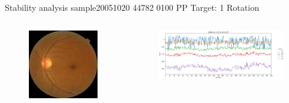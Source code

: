 \documentclass{beamer}
\begin{document}
\begin{frame}{Stability analysis sample}{20051020 44782 0100 PP Target: 1 Rotation}
\begin{columns}
\begin{column}{0.3\textwidth}
\begin{figure}[p]
\centering
\includegraphics[width=\textwidth]{chapter_stability/20051020_44782_0100_PP/20051020_44782_0100_PP.jpeg}
\end{figure}	
\end{column}
\begin{column}{0.45\textwidth}  %
\begin{figure}[p]
\centering
\includegraphics[width=\textwidth]{chapter_stability/20051020_44782_0100_PP/r/scores.png}
\end{figure}
\centering
\href{run:videos_stability/Messidor_20051020_44782_0100_PP_Target_1_Checking_Rotation_Sensitivity.mp4}{\color{blue}{Rotation Visualization}} 
\end{column}
\end{columns}
\end{frame}
\end{document}
